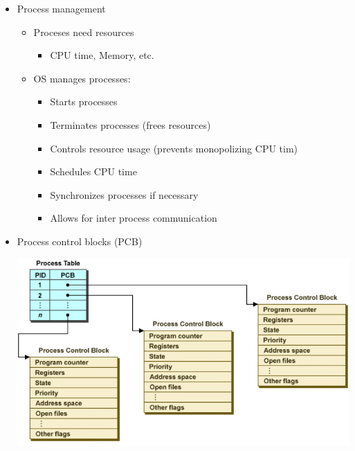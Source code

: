 \documentclass[a4paper]{article}
\begin{document}
\begin{itemize}
\begin{center}
		\end{center}
		\item Process management
			\begin{itemize}
				\item Proceses need resources
					\begin{itemize}
						\item CPU time, Memory, etc.
					\end{itemize}
				\item OS manages processes:
					\begin{itemize}
						\item Starts processes
						\item Terminates processes (frees resources)
						\item Controls resource usage (prevents monopolizing CPU tim)
						\item Schedules CPU time
						\item Synchronizes processes if necessary
						\item Allows for inter process communication
					\end{itemize}
			\end{itemize}
		\item Process control blocks (PCB)\\
		\begin{center}
			\includegraphics[scale=1.5]{Figures/PCB.jpg}
		\end{center}
\end{itemize}
\end{document}

